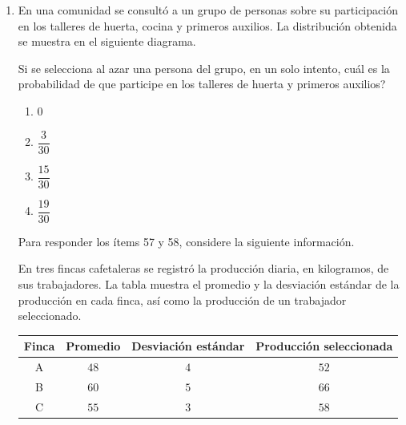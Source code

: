 \documentclass[12pt]{article}
\newcommand{\opcion}[2]{\item $#2$}
\begin{document}
\begin{enumerate}[label=\textbf{\arabic*.}, start=29, itemsep=1cm]
\Needspace{0.70\textheight}
\item
En una comunidad se consult\'o a un grupo de personas sobre su participaci\'on en los talleres de huerta, cocina y primeros auxilios. La distribuci\'on obtenida se muestra en el siguiente diagrama.

\begin{center}
\end{center}

Si se selecciona al azar una persona del grupo, en un solo intento, \textquestiondown cu\'al es la probabilidad de que participe en los talleres de huerta y primeros auxilios?

\begin{enumerate}[label=\Alph*)]
  \opcion{A}{0}
  \opcion{B}{\dfrac{3}{30}}
  \opcion{C}{\dfrac{15}{30}}
  \opcion{D}{\dfrac{19}{30}}
\end{enumerate}

\Needspace{0.90\textheight}
\noindent Para responder los \'items 57 y 58, considere la siguiente informaci\'on.

En tres fincas cafetaleras se registr\'o la producci\'on diaria, en kilogramos, de sus trabajadores. La tabla muestra el promedio y la desviaci\'on est\'andar de la producci\'on en cada finca, as\'i como la producci\'on de un trabajador seleccionado.

\begin{center}
\begingroup
\small
\renewcommand{\arraystretch}{1.35}
\begin{tabular}{|c|c|c|c|}
\hline
\textbf{Finca} & \textbf{Promedio} & \textbf{Desviaci\'on est\'andar} & \textbf{Producci\'on seleccionada} \\ \hline
A & $48$ & $4$ & $52$ \\ \hline
B & $60$ & $5$ & $66$ \\ \hline
C & $55$ & $3$ & $58$ \\ \hline
\end{tabular}
\endgroup
\end{center}


\end{enumerate}
\end{document}
